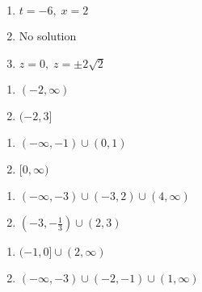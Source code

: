 \begin{multicols}{3}
\begin{enumerate}
\setcounter{enumi}{\value{HW}}

\item $t = -6, \; x = 2$
\item No solution
\item $z = 0, \; z = \pm 2\sqrt{2}$

\setcounter{HW}{\value{enumi}}
\end{enumerate}
\end{multicols}

\begin{multicols}{2}
\begin{enumerate}
\setcounter{enumi}{\value{HW}}

\item $(-2, \infty)$
\item $(-2, 3]$

\setcounter{HW}{\value{enumi}}
\end{enumerate}
\end{multicols}

\begin{multicols}{2}
\begin{enumerate}
\setcounter{enumi}{\value{HW}}


\item $(-\infty, -1) \cup (0, 1)$
\item $[0, \infty)$

\setcounter{HW}{\value{enumi}}
\end{enumerate}
\end{multicols}

\begin{multicols}{2}
\begin{enumerate}
\setcounter{enumi}{\value{HW}}

\item $(-\infty, -3) \cup (-3,2) \cup (4, \infty)$
\item $\left(-3, -\frac{1}{3} \right) \cup (2,3)$

\setcounter{HW}{\value{enumi}}
\end{enumerate}
\end{multicols}

\begin{multicols}{2}
\begin{enumerate}
\setcounter{enumi}{\value{HW}}

\item $(-1,0] \cup (2, \infty)$
\item $(-\infty, -3) \cup (-2, -1) \cup (1, \infty)$

\setcounter{HW}{\value{enumi}}
\end{enumerate}
\end{multicols}

